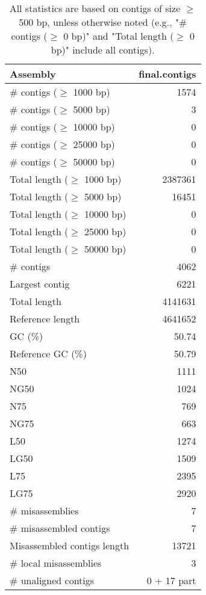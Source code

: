 \documentclass[12pt,a4paper]{article}
\begin{document}
\begin{table}[ht]
\begin{center}
\caption{All statistics are based on contigs of size $\geq$ 500 bp, unless otherwise noted (e.g., "\# contigs ($\geq$ 0 bp)" and "Total length ($\geq$ 0 bp)" include all contigs).}
\begin{tabular}{|l*{1}{|r}|}
\hline
Assembly & final.contigs \\ \hline
\# contigs ($\geq$ 1000 bp) & 1574 \\ \hline
\# contigs ($\geq$ 5000 bp) & 3 \\ \hline
\# contigs ($\geq$ 10000 bp) & 0 \\ \hline
\# contigs ($\geq$ 25000 bp) & 0 \\ \hline
\# contigs ($\geq$ 50000 bp) & 0 \\ \hline
Total length ($\geq$ 1000 bp) & 2387361 \\ \hline
Total length ($\geq$ 5000 bp) & 16451 \\ \hline
Total length ($\geq$ 10000 bp) & 0 \\ \hline
Total length ($\geq$ 25000 bp) & 0 \\ \hline
Total length ($\geq$ 50000 bp) & 0 \\ \hline
\# contigs & 4062 \\ \hline
Largest contig & 6221 \\ \hline
Total length & 4141631 \\ \hline
Reference length & 4641652 \\ \hline
GC (\%) & 50.74 \\ \hline
Reference GC (\%) & 50.79 \\ \hline
N50 & 1111 \\ \hline
NG50 & 1024 \\ \hline
N75 & 769 \\ \hline
NG75 & 663 \\ \hline
L50 & 1274 \\ \hline
LG50 & 1509 \\ \hline
L75 & 2395 \\ \hline
LG75 & 2920 \\ \hline
\# misassemblies & 7 \\ \hline
\# misassembled contigs & 7 \\ \hline
Misassembled contigs length & 13721 \\ \hline
\# local misassemblies & 3 \\ \hline
\# unaligned contigs & 0 + 17 part \\ \hline

\end{tabular}
\end{center}
\end{table}
\end{document}
